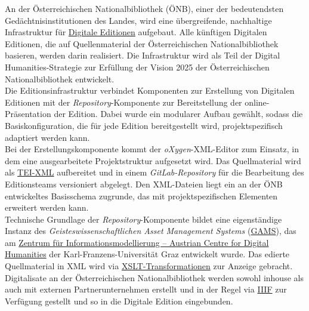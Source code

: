 \documentclass{article}
\begin{document}
    An der Österreichischen
                     Nationalbibliothek (ÖNB), einer der bedeutendsten Gedächtnisinstitutionen
                  des Landes, wird eine übergreifende, nachhaltige Infrastruktur für \href{http://gams.uni-graz.at/o:konde.59}{Digitale Editionen} aufgebaut. Alle
                  künftigen Digitalen Editionen, die auf Quellenmaterial der Österreichischen
                  Nationalbibliothek basieren, werden darin realisiert. Die Infrastruktur wird als
                  Teil der Digital Humanities-Strategie zur Erfüllung der Vision 2025 der Österreichischen Nationalbibliothek
                  entwickelt.\\
            
        Die Editionsinfrastruktur verbindet Komponenten zur Erstellung von Digitalen
                  Editionen mit der \emph{Repository}-Komponente zur Bereitstellung
                  der online-Präsentation der Edition. Dabei wurde ein modularer Aufbau gewählt,
                  sodass die Basiskonfiguration, die für jede Edition bereitgestellt wird,
                  projektspezifisch adaptiert werden kann.\\
            
        Bei der Erstellungskomponente kommt der \emph{oXygen}-XML-Editor
                  zum Einsatz, in dem eine ausgearbeitete Projektstruktur aufgesetzt wird. Das
                  Quellmaterial wird als \href{http://gams.uni-graz.at/o:konde.178}{TEI-XML}
                  aufbereitet und in einem \emph{GitLab-Repository} für die
                  Bearbeitung des Editionsteams versioniert abgelegt. Den XML-Dateien liegt ein an
                  der ÖNB entwickeltes Basisschema zugrunde, das mit projektspezifischen Elementen
                  erweitert werden kann.\\
            
        Technische Grundlage der \emph{Repository}-Komponente bildet eine
                  eigenständige Instanz des \emph{Geisteswissenschaftlichen Asset
                     Management Systems} (\href{http://gams.uni-graz.at/o:konde.70}{GAMS}),
                  das am \href{http://gams.uni-graz.at/o:konde.217}{Zentrum für Informationsmodellierung – Austrian Centre for Digital
                     Humanities} der Karl-Franzens-Universität Graz entwickelt wurde. Das
                  edierte Quellmaterial in XML wird via \href{http://gams.uni-graz.at/o:konde.86}{XSLT-Transformationen} zur Anzeige gebracht. Digitalisate an der
                  Österreichischen Nationalbibliothek werden sowohl inhouse als auch mit externen
                  Partnerunternehmen erstellt und in der Regel via \href{http://gams.uni-graz.at/o:konde.123}{IIIF} zur Verfügung gestellt und so in die Digitale
                  Edition eingebunden.\\
            
\end{document}
